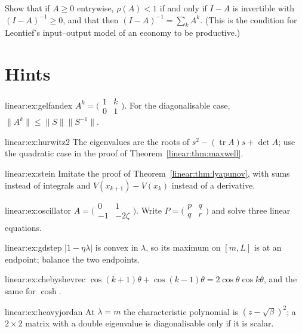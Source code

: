 \begin{exercise}[$\star\star\star$]\label{linear:ex:leontief}
Show that if $A\ge0$ entrywise, $\rho(A)<1$ if and only if $I-A$ is invertible with $(I-A)^{-1}\ge0$, and that then $(I-A)^{-1}=\sum_kA^k$.
(This is the condition for Leontief's input--output model of an economy to be productive.)
\end{exercise}

\section{Hints}

\begin{hint}{linear:ex:gelfandex}
$A^k=\bigl(\begin{smallmatrix}1&k\\0&1\end{smallmatrix}\bigr)$. For the diagonalisable case, $\|A^k\|\le\|S\|\|S^{-1}\|$.
\end{hint}
\begin{hint}{linear:ex:hurwitz2}
The eigenvalues are the roots of $s^2-(\operatorname{tr}A)s+\det A$; use the quadratic case in the proof of Theorem~\ref{linear:thm:maxwell}.
\end{hint}
\begin{hint}{linear:ex:stein}
Imitate the proof of Theorem~\ref{linear:thm:lyapunov}, with sums instead of integrals and $V(x_{k+1})-V(x_k)$ instead of a derivative.
\end{hint}
\begin{hint}{linear:ex:oscillator}
$A=\bigl(\begin{smallmatrix}0&1\\-1&-2\zeta\end{smallmatrix}\bigr)$. Write $P=\bigl(\begin{smallmatrix}p&q\\q&r\end{smallmatrix}\bigr)$ and solve three
linear equations.
\end{hint}
\begin{hint}{linear:ex:gdstep}
$|1-\eta\lambda|$ is convex in $\lambda$, so its maximum on $[m,L]$ is at an endpoint; balance the two endpoints.
\end{hint}
\begin{hint}{linear:ex:chebyshevrec}
$\cos(k+1)\theta+\cos(k-1)\theta=2\cos\theta\cos k\theta$, and the same for $\cosh$.
\end{hint}
\begin{hint}{linear:ex:heavyjordan}
At $\lambda=m$ the characteristic polynomial is $(z-\sqrt\beta)^2$; a $2\times2$ matrix with a double eigenvalue is diagonalisable only if it
is scalar.
\end{hint}
